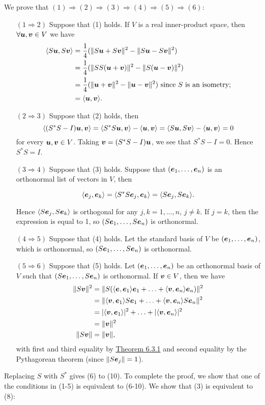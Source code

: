 \documentclass{report}
\begin{document}
	\begin{myproof} We prove that $(1)\Rightarrow (2)\Rightarrow (3)\Rightarrow (4)\Rightarrow (5)\Rightarrow (6)$:
		\begin{enumerate}
			\item[$(1\Rightarrow 2)$] Suppose that (1) holds. If $V$ is a real inner-product space, then $\forall \boldsymbol{u},\boldsymbol{v}\in V$ we have
			\begin{align*}
				\langle S\boldsymbol{u},S\boldsymbol{v}\rangle&=\frac{1}{4}(\|S\boldsymbol{u}+S\boldsymbol{v}\|^2-\|S\boldsymbol{u}-S\boldsymbol{v}\|^2)\\
				&=\frac{1}{4}(\|SS(\boldsymbol{u}+\boldsymbol{v})\|^2-\|S(\boldsymbol{u}-\boldsymbol{v})\|^2)\\
				&=\frac{1}{4}(\|\boldsymbol{u}+\boldsymbol{v}\|^2-\|\boldsymbol{u}-\boldsymbol{v}\|^2)\text{ since }S\text{ is an isometry;}\\
				&=\langle\boldsymbol{u},\boldsymbol{v}\rangle.
			\end{align*}
			\item[$(2\Rightarrow 3)$] Suppose that (2) holds, then
			$$\langle(S^*S-I)\boldsymbol{u},\boldsymbol{v}\rangle=\langle S^*S\boldsymbol{u},\boldsymbol{v}\rangle-\langle\boldsymbol{u},\boldsymbol{v}\rangle=\langle S\boldsymbol{u},S\boldsymbol{v}\rangle-\langle\boldsymbol{u},\boldsymbol{v}\rangle=0$$
			for every $\boldsymbol{u},\boldsymbol{v}\in V$. Taking $\boldsymbol{v}=(S^*S-I)\boldsymbol{u}$, we see that $S^*S-I=0$. Hence $S^*S=I$.
			\item[$(3\Rightarrow 4)$] Suppose that (3) holds. Suppose that $(\boldsymbol{e}_1,\ldots,\boldsymbol{e}_n)$ is an orthonormal list of vectors in $V$, then
			
			$$\langle \boldsymbol{e}_j,\boldsymbol{e}_k\rangle=\langle S^*S\boldsymbol{e}_j,\boldsymbol{e}_k\rangle=\langle S\boldsymbol{e}_j, S\boldsymbol{e}_k\rangle.$$
			
			Hence $\langle S\boldsymbol{e}_j, S\boldsymbol{e}_k\rangle$ is orthogonal for any $j,k=1,\ldots,n$, $j\neq k$. If $j=k$, then the expression is equal to 1, so $(S\boldsymbol{e}_1,\ldots,S\boldsymbol{e}_n)$ is orthonormal.\\
			\item[$(4\Rightarrow 5)$] Suppose that (4) holds. Let the standard basis of $V$ be $(\boldsymbol{e}_1,\ldots,\boldsymbol{e}_n)$, which is orthonormal, so $(S\boldsymbol{e}_1,\ldots,S\boldsymbol{e}_n)$ is orthonormal. \\
			\item[$(5\Rightarrow 6)$] Suppose that (5) holds. Let $(\boldsymbol{e}_1,\ldots,\boldsymbol{e}_n)$ be an orthonormal basis of $V$ such that $(S\boldsymbol{e}_1,\ldots,S\boldsymbol{e}_n)$ is orthonormal. If $\boldsymbol{v}\in V$, then we have
			\begin{align*}
				\|S\boldsymbol{v}\|^2&=\|S(\langle\boldsymbol{e},\boldsymbol{e}_1\rangle\boldsymbol{e}_1+\ldots+\langle\boldsymbol{v},\boldsymbol{e}_n\rangle\boldsymbol{e}_n)\|^2\\
				&=\|\langle\boldsymbol{v},\boldsymbol{e}_1\rangle S\boldsymbol{e}_1+\ldots+\langle\boldsymbol{v},\boldsymbol{e}_n\rangle S\boldsymbol{e}_n\|^2\\
				&=|\langle\boldsymbol{v},\boldsymbol{e}_1\rangle|^2+\ldots+|\langle\boldsymbol{v},\boldsymbol{e}_n\rangle|^2\\
				&=\|\boldsymbol{v}\|^2\\
				\|S\boldsymbol{v}\|&=\|\boldsymbol{v}\|,
			\end{align*}
			with first and third equality by \hyperref[sec:Thm4]{Theorem 6.3.1} and second equality by the Pythagorean theorem (since $\|S\boldsymbol{e}_j\|=1$). \\
		\end{enumerate}
		Replacing $S$ with $S^*$ gives (6) to (10). To complete the proof, we show that one of the conditions in (1-5) is equivalent to (6-10). We show that (3) is equivalent to (8):\\
		

\end{myproof}
\end{document}
